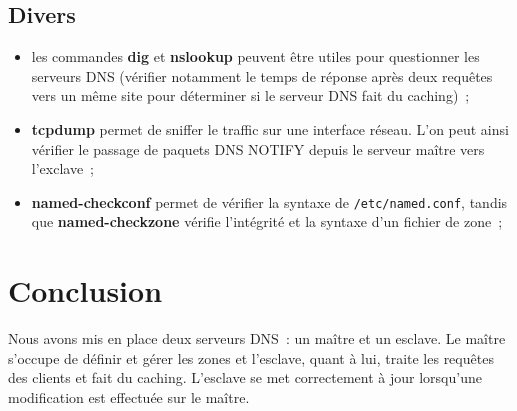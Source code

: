 \documentclass[11pt,a4paper,oneside]{article}
\newcommand{\inlinecode}{\lstinline[breaklines=true]}
\begin{document}
\subsection{Divers}
\begin{itemize}
    \item les commandes \textbf{dig} et \textbf{nslookup} peuvent être utiles
        pour questionner les serveurs DNS (vérifier notamment le temps de
        réponse après deux requêtes vers un même site pour déterminer si le
        serveur DNS fait du caching)~;
    \item \textbf{tcpdump} permet de sniffer le traffic sur une interface
        réseau. L'on peut ainsi vérifier le passage de paquets DNS NOTIFY depuis
        le serveur maître vers l'exclave~;
    \item \textbf{named-checkconf} permet de vérifier la syntaxe de
        \inlinecode{/etc/named.conf}, tandis que \textbf{named-checkzone}
        vérifie l'intégrité et la syntaxe d'un fichier de zone~;
\end{itemize}

\section{Conclusion}

Nous avons mis en place deux serveurs DNS~: un maître et un esclave. Le maître
s'occupe de définir et gérer les zones et l'esclave, quant à lui, traite les
requêtes des clients et fait du caching. L'esclave se met correctement à jour lorsqu'une
modification est effectuée sur le maître.
\end{document}
